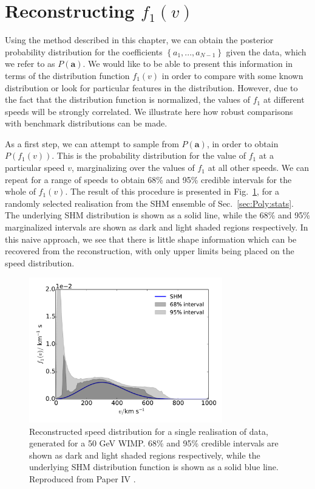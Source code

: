 \section{Reconstructing $f_1(v)$}
\label{sec:Poly:Recon}

Using the method described in this chapter, we can obtain the posterior probability distribution for the coefficients $\left\{ a_1, ..., a_{N-1}\right\}$ given the data, which we refer to as $P(\textbf{a})$. We would like to be able to present this information in terms of the distribution function $f_1(v)$ in order to compare with some known distribution or look for particular features in the distribution. However, due to the fact that the distribution function is normalized, the values of $f_1$ at different speeds will be strongly correlated. We illustrate here how robust comparisons with benchmark distributions can be made.

As a first step, we can attempt to sample from $P(\textbf{a})$, in order to obtain $P(f_1(v))$. This is the probability distribution for the value of $f_1$ at a particular speed $v$, marginalizing over the values of $f_1$ at all other speeds. We can repeat for a range of speeds to obtain 68\% and 95\% credible intervals for the whole of $f_1(v)$. The result of this procedure is presented in Fig.~\ref{fig:Poly:f}, for a randomly selected realisation from the SHM ensemble of Sec.~\ref{sec:Poly:stats}. The underlying SHM distribution is shown as a solid line, while the 68\% and 95\% marginalized intervals are shown as dark and light shaded regions respectively. In this naive approach, we see that there is little shape information which can be recovered from the reconstruction, with only upper limits being placed on the speed distribution.

\begin{figure}[t]
\centering
  \includegraphics[width=0.75\textwidth]{Poly/f_SHM.pdf}
  \caption[Reconstructed speed distribution for a single realisation of data using the polynomial $\ln f(v)$ parametrisation]{Reconstructed speed distribution for a single realisation of data, generated for a 50 GeV WIMP. 68\% and 95\% credible intervals are shown as dark and light shaded regions respectively, while the underlying SHM distribution function is shown as a solid blue line. Reproduced from Paper IV \cite{Kavanagh:2014}.}
  \label{fig:Poly:f}
\end{figure}


